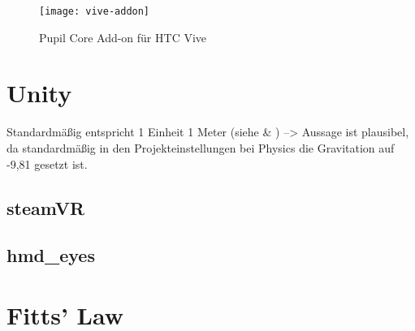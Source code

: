 \begin{figure}[!htbp]
	\centering
	\texttt{[image: vive-addon]}
	\caption[Pupil Core Add-on für HTC Vive]{Pupil Core Add-on für HTC Vive \cite{PupilLabsAddOn}}
	\label{fig:pupil_labs_addon}
\end{figure}

\cite{Clay_Koenig_Koenig_2019}

\cite{Kassner_2014}

\section{Unity}
Standardmäßig entspricht 1 Einheit 1 Meter (siehe \cite{BrentAllard.2017} \& \cite{AVividLight.2010}) --> Aussage ist plausibel, da standardmäßig in den Projekteinstellungen bei Physics die Gravitation auf -9,81 gesetzt ist.

\subsection{steamVR}

\subsection{hmd\_eyes}

\section{Fitts' Law}